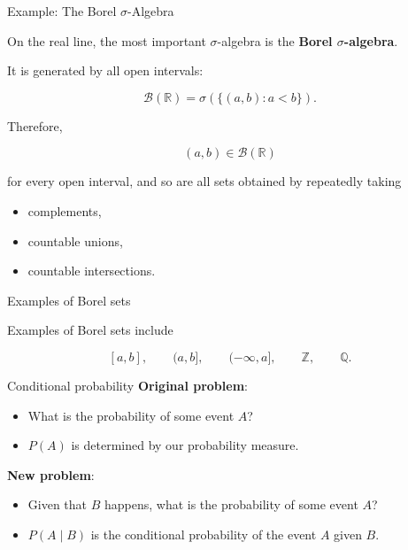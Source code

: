 \documentclass [aspectratio=169]{beamer}
\begin{document}
\begin{frame}{Example: The Borel $\sigma$-Algebra}

On the real line, the most important $\sigma$-algebra is the
\textbf{Borel $\sigma$-algebra}.

It is generated by all open intervals:

\[
\mathcal B(\mathbb R)
=
\sigma
\left(
\{
(a,b):a<b
\}
\right).
\]

\vspace{4mm}

Therefore,

\[
(a,b)
\in
\mathcal B(\mathbb R)
\]

for every open interval, and so are all sets obtained by repeatedly taking

\begin{itemize}
\item complements,
\item countable unions,
\item countable intersections.
\end{itemize}



\end{frame}

\begin{frame}{Examples of Borel sets}

Examples of Borel sets include

\[
[a,b],\qquad
(a,b],\qquad
(-\infty,a],\qquad
\mathbb Z,\qquad
\mathbb Q.
\]

\vspace{5cm}

\end{frame}

\begin{frame}{Conditional probability}
\vspace{0.1in}
\textbf{Original problem}:
\begin{itemize}
    \item What is the probability of some event $A$?
    \item $P(A)$ is determined by our probability measure.
\end{itemize}
\vspace{0.1in}
\textbf{New problem}:
\begin{itemize}
    \item Given that $B$ happens, what is the probability of some event $A$?
    \item $P(A \mid B)$ is the conditional probability of the event $A$ given $B$.
\end{itemize}
\vspace{0.1in}
\end{frame}
\end{document}
